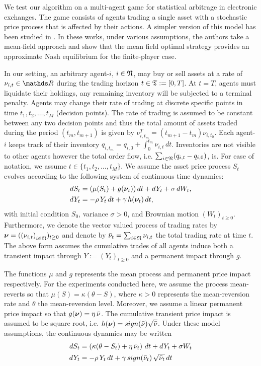 \documentclass[onefignum,onetabnum]{siamonline171218}
\begin{document}
We test our algorithm on a multi-agent game for statistical arbitrage in electronic exchanges. The game consists of agents trading a single asset with a stochastic  price process that is affected by their actions. A simpler version of this model has been studied in \cite{casgrain2018algorithmic,casgrain2020mean, neuman2021trading}. In these works, under various assumptions, the authors take a mean-field approach and show that the mean field optimal strategy provides an approximate Nash equilibrium for the finite-player case.

In our setting, an arbitrary agent-$i$, $i\in{\mathfrak{N}}$, may buy or sell assets at a rate of $\nu_{i,t} \in \R$ during the trading horizon $t\in\mathfrak{T}:=[0, T]$. At $t=T$,  agents must liquidate their holdings, any remaining inventory will be subjected to a terminal penalty. Agents may change their rate of trading at discrete specific points in time $t_1, t_2, \dots, t_M$ (decision points). The rate of trading is assumed to be constant between any two decision points and thus the total amount of assets traded during the period $(t_m, t_{m+1})$ is given by $\nu_{i,t_m}^T = (t_{m+1} - t_m) \nu_{i,t_0}$. Each agent-$i$ keeps track of their inventory $q_{i,t_m} = q_{i,0} + \int_0^{t_m} \nu_{i,t} \, dt$. Inventories are not visible to other agents however the total order flow, i.e. $\sum_{i\in{\mathfrak{N}}}(q_{i,t} - q_{i,0})$, is. For ease of notation, we assume $t \in \{ t_1, t_2, \dots, t_M \}$. 
We assume the asset price process $S_t$  evolves according to the following system of continuous time dynamics:
\begin{align}
	dS_t &= (\mu(S_t) + g(\bnu_t)) \, dt + dY_t + \sigma \,dW_t, \\
	dY_t &= -\rho\,Y_t\,dt + \gamma \, h(\bnu_t) \, dt,
	\label{eq:smpl-dynamics}
\end{align}
with initial condition $S_0$, variance $\sigma > 0$, and Brownian motion $(W_t)_{t\ge0}$. Furthermore, we denote the vector valued process of trading rates by $\bm{\nu} = (\left( \nu_{i,t} \right)_{i\in{\mathfrak{N}}})_{t\ge0}$ and denote by $\bar{\nu}_t = \sum_{i\in{\mathfrak{N}}} \nu_{i,t}$ the total trading rate at time $t$. The above form assumes the cumulative trades of all agents induce both a transient impact through $Y:=(Y_t)_{t\ge0}$ and a permanent impact through $g$.

The functions $\mu$ and $g$ represents the mean process and permanent price impact respectively. For the experiments conducted here, we assume the process mean-reverts so that $\mu(S) = \kappa(\theta - S)$, where $\kappa>0$ represents the mean-reversion rate and $\theta$ the mean-reversion level. Moreover, we assume a linear permanent price impact so that $g(\bm{\nu}) = \eta \, \bar{\nu} $. The cumulative transient price impact is assumed to be square root, i.e. $h(\bm{\nu}) = sign(\bar{\nu})\sqrt{\bar{\nu}}$. Under these model assumptions, the continuous dynamics may be written
\begin{align}
	dS_t &= \left(\kappa(\theta - S_t) + \eta \,\nubar_t\right)\, dt + dY_t  + \sigma W_t \\
	dY_t &= -\rho\,Y_t\,dt + \gamma \, sign(\nubar_t) \, \sqrt{\nubar_t} \, dt
	\label{eq:full-dynamics}
\end{align}
\end{document}
